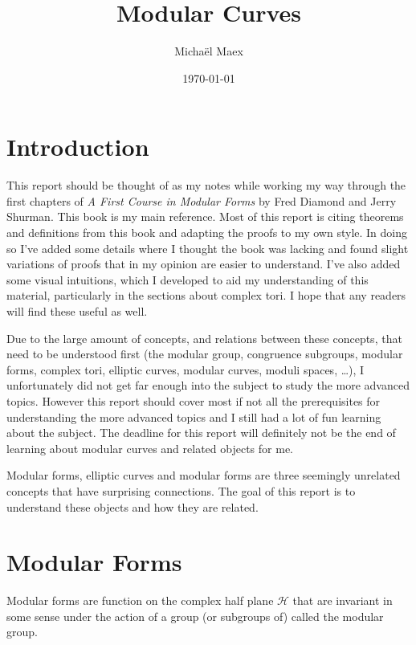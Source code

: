 \documentclass[titlepage,a4paper]{article}
\author{Micha\"el Maex}
\date{\today}
\title{Modular Curves}
\theoremstyle{theoremdd}
\theoremstyle{definitiondd}
\theoremstyle{remarkdd}
\begin{document}
    \maketitle
\begingroup
  \pagestyle{empty}
  \null
  \newpage
\endgroup
{}
\tableofcontents
\pagebreak

\section{Introduction}

This report should be thought of as my notes while working my way through the first chapters of \emph{A First Course in Modular Forms} by Fred Diamond and Jerry Shurman\cite{diamondFirstCourseModular2005a}. 
This book is my main reference. 
Most of this report is citing theorems and definitions from this book and adapting the proofs to my own style. In doing so I've added some details where I thought the book was lacking and found slight variations of proofs that in my opinion are easier to understand.
I've also added some visual intuitions, which I developed to aid my understanding of this material, particularly in the sections about complex tori. 
I hope that any readers will find these useful as well. 

Due to the large amount of concepts, and relations between these concepts, that need to be understood first (the modular group, congruence subgroups, modular forms, complex tori, elliptic curves, modular curves, moduli spaces, \ldots), I unfortunately did not get far enough into the subject to study the more advanced topics. 
However this report should cover most if not all the prerequisites for understanding the more advanced topics and I still had a lot of fun learning about the subject. 
The deadline for this report will definitely not be the end of learning about modular curves and related objects for me.

Modular forms, elliptic curves and modular forms are three seemingly unrelated concepts that have surprising connections. 
The goal of this report is to understand these objects and how they are related. 

\section{Modular Forms}
Modular forms are function on the complex half plane $\mathcal{H} $ that are invariant in some sense under the action of a group (or subgroups of) called the modular group.
\end{document}
